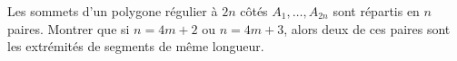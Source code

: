 Les sommets d'un polygone régulier à $2n$ côtés $A_1, \ldots, A_{2n}$ sont répartis en $n$ paires. Montrer que si $n = 4m + 2$ ou $n = 4m + 3$, alors deux de ces paires sont les extrémités de segments de même longueur.
